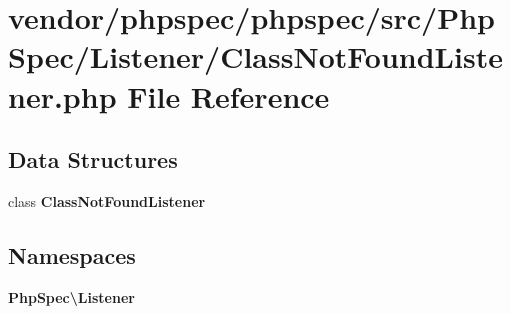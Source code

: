 \section{vendor/phpspec/phpspec/src/\+Php\+Spec/\+Listener/\+Class\+Not\+Found\+Listener.php File Reference}
\label{_class_not_found_listener_8php}
\subsection*{Data Structures}
\begin{DoxyCompactItemize}
\item 
class {\bf Class\+Not\+Found\+Listener}
\end{DoxyCompactItemize}
\subsection*{Namespaces}
\begin{DoxyCompactItemize}
\item 
 {\bf Php\+Spec\textbackslash{}\+Listener}
\end{DoxyCompactItemize}
